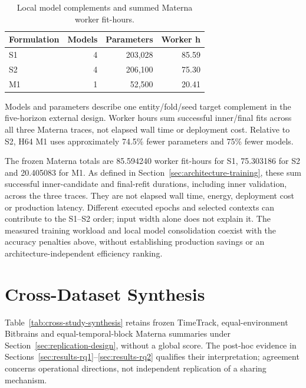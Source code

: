 \documentclass[5p,twocolumn]{elsarticle}
\begin{document}
\begin{table}[t]
  \caption{Local model complements and summed Materna worker fit-hours.}
  \label{tab:efficiency}
  \centering
  \small
  \begin{tabular}{@{}lrrr@{}}
    \toprule
    Formulation & Models & Parameters & Worker h \\
    \midrule
    S1 & 4 & 203,028 & 85.59 \\
    S2 & 4 & 206,100 & 75.30 \\
    M1 & 1 &  52,500 & 20.41 \\
    \bottomrule
  \end{tabular}

  \vspace{2pt}
  \parbox{\columnwidth}{\footnotesize Models and parameters describe one
  entity/fold/seed target complement in the five-horizon external design.
  Worker hours sum successful inner/final fits across all three Materna
  traces, not elapsed wall time or deployment cost. Relative to S2, H64 M1
  uses approximately 74.5\% fewer parameters and 75\% fewer models.}
\end{table}


The frozen Materna totals are 85.594240 worker fit-hours for S1, 75.303186 for
S2 and 20.405083 for M1. As defined in Section~\ref{sec:architecture-training},
these sum successful inner-candidate and final-refit durations, including
inner validation, across the three traces. They are not elapsed wall time,
energy, deployment cost or production latency. Different executed epochs and
selected contexts can contribute to the S1--S2 order; input width alone does
not explain it. The measured training workload and local model consolidation
coexist with the accuracy penalties above, without establishing production
savings or an architecture-independent efficiency ranking.

\section{Cross-Dataset Synthesis}
\label{sec:cross-dataset-synthesis}

Table~\ref{tab:cross-study-synthesis} retains frozen TimeTrack,
equal-environment Bitbrains and equal-temporal-block Materna summaries under
Section~\ref{sec:replication-design}, without a global score.
The post-hoc evidence in Sections~\ref{sec:results-rq1}--\ref{sec:results-rq2}
qualifies their interpretation; agreement concerns operational directions,
not independent replication of a sharing mechanism.
\end{document}
